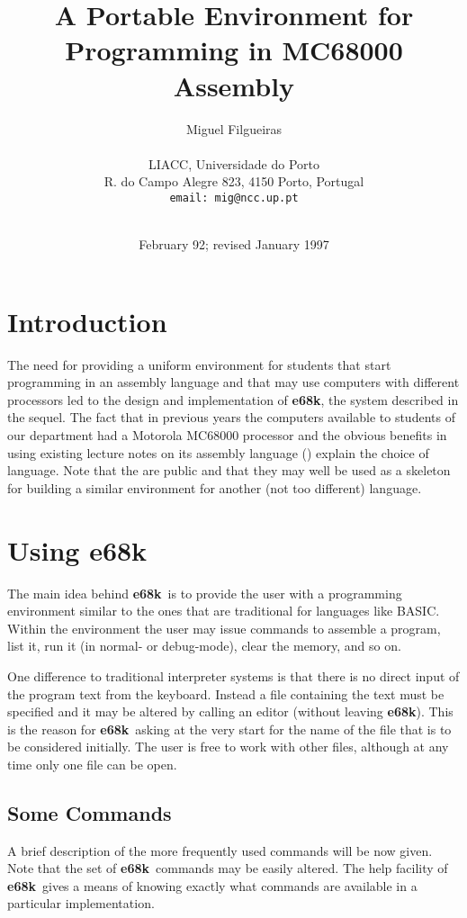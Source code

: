 \documentclass[a4,11pt]{article}
\title{A Portable Environment for Programming in MC68000
Assembly}
\author{Miguel Filgueiras\\
\\
{\small LIACC, Universidade do
Porto}\\
{\small R. do Campo Alegre 823, 4150 Porto, Portugal}\\
{\small {\tt email: mig@ncc.up.pt}}\\
\\
}
\date{February 92; revised January 1997}
\newcommand{\esek}{{\bf e68k}}
\begin{document}
\maketitle

\section{Introduction}

The need for providing a uniform environment for students that
start programming in an assembly language and that may use
computers with different processors led to the design and
implementation of \esek, the system described in the
sequel.
The fact that in previous years the computers
available to students of our department had a Motorola MC68000
processor and the obvious benefits in using existing lecture notes on its
assembly language (\cite{Toma91}) explain the choice of language. 
Note that the
\xlink{sources of \esek}{e68k.tgz}
are public and that they may well
be used as a skeleton for building a similar environment for another
(not too different) language.

\section{Using \esek}

The main idea behind \esek\    is to provide the user with a
programming environment similar to the ones that are traditional for
languages like BASIC. Within the environment the user may issue
commands to
assemble a program, list it, run it (in normal- or debug-mode), clear the
memory, and so on.

One difference to traditional interpreter systems
is that there is no direct input of the program text from the keyboard.
Instead a file containing the text must be specified and it may be altered
by calling an editor (without leaving \esek). This is the reason for
\esek\    asking at the very start for the name of the file that
is to be considered initially. The user is free to work with other files,
although at any time only one file can be open.

\subsection{Some Commands}

A brief description of the more frequently used commands will be now
given. Note that the set of \esek\    commands may be easily
altered. The help facility of \esek\    gives a means of
knowing exactly what commands are available in a particular
implementation.
\end{document}
